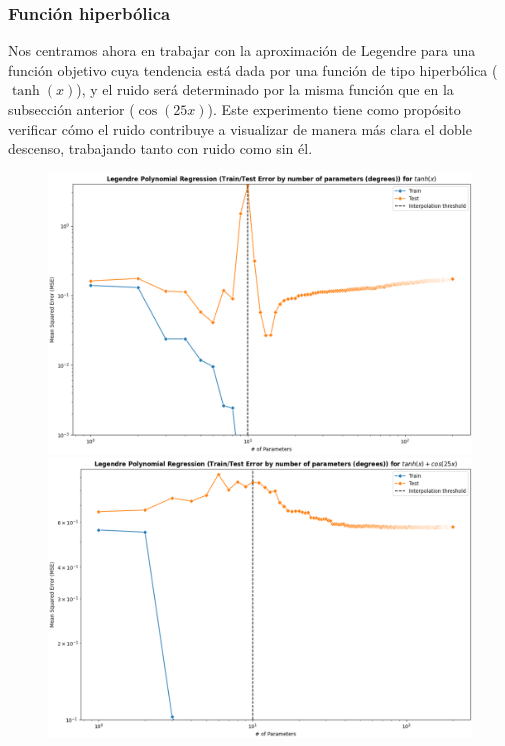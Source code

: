 \subsubsection{Función hiperbólica}\label{subsubsec:funcion-hiperbolica}

Nos centramos ahora en trabajar con la aproximación de Legendre para una función objetivo cuya tendencia está dada por una función de tipo hiperbólica ($\tanh(x)$), y el ruido será determinado por la misma función que en la subsección anterior ($\cos(25x)$). Este experimento tiene como propósito verificar cómo el ruido contribuye a visualizar de manera más clara el doble descenso, trabajando tanto con ruido como sin él.\newline

\begin{figure}[h]
    \centering
    \begin{minipage}{0.4\textwidth}
        \centering
        \includegraphics[width=\linewidth]{img/experiments/hiperbolica_noiselessDDD.png}
    \end{minipage}
    \hfill
    \begin{minipage}{0.4\textwidth}
        \centering
        \includegraphics[width=\linewidth]{img/experiments/hiperbolica_noiseDDD.png}

\end{minipage}
\end{figure}
